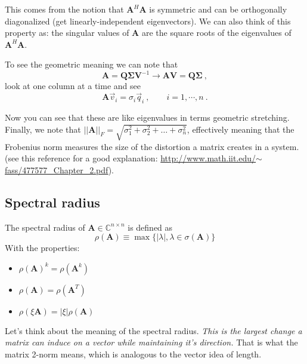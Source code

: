 \documentclass[12pt]{article}
\newcommand{\ve}[1]{\ensuremath{\mathbf{#1}}}
\newcommand{\cc}[1]{\ensuremath{\overline{#1}}}
\newcommand{\ccm}[1]{\ensuremath{\overline{\mathbf{#1}}}}
\begin{document}
This comes from the notion that $\ve{A}^H\ve{A}$ is symmetric and can be orthogonally diagonalized (get linearly-independent eigenvectors). We can also think of this property as: the singular values of $\ve{A}$ are the square roots of the eigenvalues of $\ve{A}^H\ve{A}$. 

To see the geometric meaning we can note that 
\[\ve{A} = \ve{Q} \ve{\Sigma} \ve{V}^{-1} \rightarrow \ve{A}\ve{V} = \ve{Q} \ve{\Sigma} \:,\]
look at one column at a time and see
\[\ve{A}\vec{v}_i = \sigma_i \vec{q}_i \:, \qquad i = 1, \cdots, n \:.\]

Now you can see that these are like eigenvalues in terms geometric stretching. Finally, we note that $||\ve{A}||_F = \sqrt{\sigma_1^2 + \sigma_2^2 + \dots + \sigma_n^2}$, effectively meaning that the Frobenius norm measures the size of the distortion a matrix creates in a system. (see this reference for a good explanation: \href{http://www.math.iit.edu/~fass/477577_Chapter_2.pdf}{http://www.math.iit.edu/$\sim$fass/477577\_Chapter\_2.pdf}).


\subsection*{Spectral radius} 

The spectral radius of $\ve{A} \in \mathbb{C}^{n \times n}$ is defined as 
\[\rho(\ve{A}) \equiv \max \lbrace |\lambda|, \lambda \in \sigma(\ve{A}) \rbrace\]
With the properties:
%
\begin{itemize}
\item $\rho(\ve{A})^k = \rho(\ve{A}^k)$
\item $\rho(\ve{A}) = \rho(\ve{A}^T)$
\item $\rho(\xi \ve{A}) = |\xi| \rho(\ve{A})$
\end{itemize}
%
Let's think about the meaning of the spectral radius. \textit{This is the largest change a matrix can induce on a vector while maintaining it's direction.} That is what the matrix 2-norm means, which is analogous to the vector idea of length.

\end{document}
